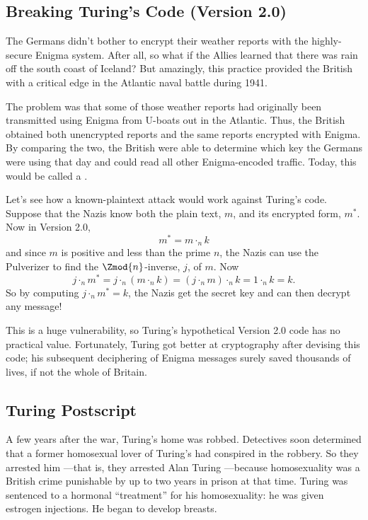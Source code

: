 \subsection{Breaking Turing's Code (Version 2.0)}

The Germans didn't bother to encrypt their weather reports with the
highly-secure Enigma system.  After all, so what if the Allies learned
that there was rain off the south coast of Iceland?  But amazingly,
this practice provided the British with a critical edge in the
Atlantic naval battle during 1941.

The problem was that some of those weather reports had originally been
transmitted using Enigma from U-boats out in the Atlantic.  Thus, the
British obtained both unencrypted reports and the same reports
encrypted with Enigma.  By comparing the two, the British were able to
determine which key the Germans were using that day and could read all
other Enigma-encoded traffic.  Today, this would be called a
.

Let's see how a known-plaintext attack would work against Turing's
code.  Suppose that the Nazis know both the plain text, $m$, and its
encrypted form, $m^*$.  Now in Version 2.0,
\[
m^* = m \cdot_n k
\]
and since $m$ is positive and less than the prime $n$, the Nazis can
use the Pulverizer to find the $\Zmod{n}$-inverse, $j$, of $m$.  Now
\[
j \cdot_n m^* = j \cdot_n (m \cdot_n k) = (j \cdot_n m) \cdot_n k
= 1 \cdot_n k = k.
\]
So by computing $j \cdot_n m^* = k$, the Nazis get the secret key and
can then decrypt any message!

This is a huge vulnerability, so Turing's hypothetical Version 2.0
code has no practical value.  Fortunately, Turing got better at
cryptography after devising this code; his subsequent deciphering of
Enigma messages surely saved thousands of lives, if not the whole of
Britain.


\subsection{Turing Postscript}

A few years after the war, Turing's home was robbed.  Detectives soon
determined that a former homosexual lover of Turing's had conspired in
the robbery.  So they arrested him ---that is, they arrested Alan
Turing ---because homosexuality was a British crime punishable by up
to two years in prison at that time.  Turing was sentenced to a
hormonal ``treatment'' for his homosexuality: he was given estrogen
injections.  He began to develop breasts.

